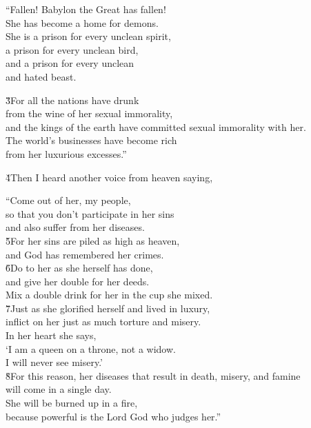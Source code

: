 \begin{poetry}
\poeml ``Fallen! Babylon the Great has fallen! \\
\poemll    She has become a home for demons. \\
\poeml She is a prison for every unclean spirit, \\
\poemll    a prison for every unclean bird, \\
\poemll    and a prison for every unclean \\
\poemlll       and hated beast.
\end{poetry}

\begin{poetry}
\poeml \v{3}For all the nations have drunk \\
\poemll    from the wine of her sexual immorality, \\
\poeml and the kings of the earth have committed sexual immorality with her. \\
\poeml The world's businesses have become rich \\
\poemll    from her luxurious excesses.''
\end{poetry}

\v{4}Then I heard another voice from heaven saying,

\begin{poetry}
\poeml ``Come out of her, my people, \\
\poemll    so that you don't participate in her sins \\
\poemlll       and also suffer from her diseases. \\
\poeml \v{5}For her sins are piled as high as heaven, \\
\poemll    and God has remembered her crimes. \\
\poeml \v{6}Do to her as she herself has done, \\
\poemll    and give her double for her deeds. \\
\poeml Mix a double drink for her in the cup she mixed. \\
\poeml \v{7}Just as she glorified herself and lived in luxury, \\
\poemll    inflict on her just as much torture and misery. \\
\poeml In her heart she says, \\
\poemll    `I am a queen on a throne, not a widow. \\
\poemlll       I will never see misery.' \\
\poeml \v{8}For this reason, her diseases that result in death, misery, and famine \\
\poemll    will come in a single day. \\
\poeml She will be burned up in a fire, \\
\poemll    because powerful is the Lord God who judges her.''
\end{poetry}

